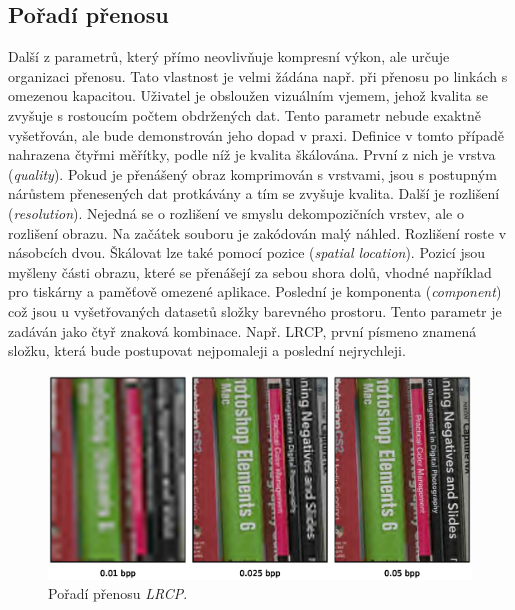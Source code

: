 \subsection*{Pořadí přenosu}
Další z parametrů, který přímo neovlivňuje kompresní výkon, ale určuje organizaci přenosu. Tato vlastnost je velmi žádána např. při přenosu po linkách s omezenou kapacitou. Uživatel je obsloužen vizuálním vjemem, jehož kvalita se zvyšuje s rostoucím počtem obdržených dat. Tento parametr nebude exaktně vyšetřován, ale bude demonstrován jeho dopad v praxi. Definice  v tomto případě nahrazena čtyřmi měřítky, podle níž je kvalita škálována. První z nich je vrstva (\textit{quality}). Pokud je přenášený obraz komprimován s vrstvami, jsou s postupným nárůstem přenesených dat protkávány a tím se zvyšuje kvalita. Další je rozlišení (\textit{resolution}). Nejedná se o rozlišení ve smyslu dekompozičních vrstev, ale o rozlišení obrazu. Na začátek souboru je zakódován malý náhled. Rozlišení roste v násobcích dvou. Škálovat lze také pomocí pozice (\textit{spatial location}). Pozicí jsou myšleny části obrazu, které se přenášejí za sebou shora dolů, vhodné například pro tiskárny a paměťově omezené aplikace. Poslední je komponenta (\textit{component}) což jsou u vyšetřovaných datasetů složky barevného prostoru. Tento parametr je zadáván jako čtyř znaková kombinace. Např. LRCP, první písmeno znamená složku, která bude postupovat nejpomaleji a poslední nejrychleji. 

\begin{figure}[hbt!]
  \centering
  \hspace*{-0.75cm}
  \includegraphics[width=16cm]{obrazky-figures/order/lrcp.eps}
  \caption{Pořadí přenosu \textit{LRCP}.}
\end{figure}

